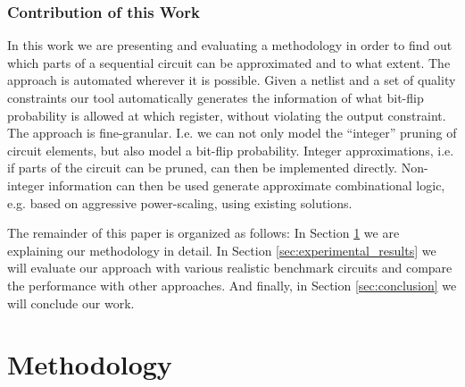 \documentclass[conference]{IEEEtran}
\begin{document}
\subsubsection*{Contribution of this Work}
 In this work we are presenting and evaluating a methodology in order to find out which parts of a sequential circuit can be approximated and to what extent. The approach is automated wherever it is possible. Given a netlist and a set of quality constraints our tool automatically generates the information of what bit-flip probability is allowed at which register, without violating the output constraint. The approach is fine-granular. I.e. we can not only model the ``integer'' pruning of circuit elements, but also model a bit-flip probability. Integer approximations, i.e. if parts of the circuit can be pruned, can then be implemented directly. Non-integer information can then be used generate approximate combinational logic, e.g. based on aggressive power-scaling, using existing solutions.

The remainder of this paper is organized as follows: In Section \ref{sec:methodology} we are explaining our methodology in detail. In Section \ref{sec:experimental_results} we will evaluate our approach with various realistic benchmark circuits and compare the performance with other approaches. And finally, in Section \ref{sec:conclusion} we will conclude our work. 





\section{Methodology}
\label{sec:methodology}
\end{document}
